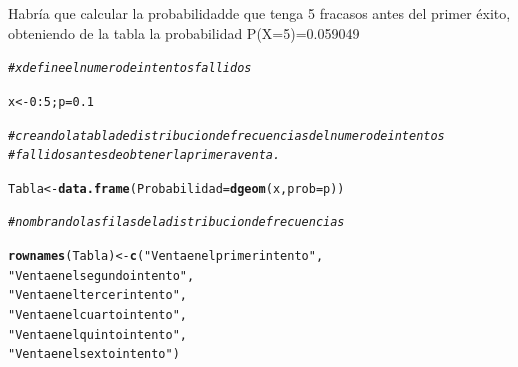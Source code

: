 \documentclass[12pt,letterpaper]{article}\usepackage[]{graphicx}\usepackage[]{color}
\makeatletter
\newcommand{\hlnum}[1]{\textcolor[rgb]{0.686,0.059,0.569}{#1}}%
\newcommand{\hlstr}[1]{\textcolor[rgb]{0.192,0.494,0.8}{#1}}%
\newcommand{\hlcom}[1]{\textcolor[rgb]{0.678,0.584,0.686}{\textit{#1}}}%
\newcommand{\hlopt}[1]{\textcolor[rgb]{0,0,0}{#1}}%
\newcommand{\hlstd}[1]{\textcolor[rgb]{0.345,0.345,0.345}{#1}}%
\newcommand{\hlkwb}[1]{\textcolor[rgb]{0.69,0.353,0.396}{#1}}%
\newcommand{\hlkwc}[1]{\textcolor[rgb]{0.333,0.667,0.333}{#1}}%
\newcommand{\hlkwd}[1]{\textcolor[rgb]{0.737,0.353,0.396}{\textbf{#1}}}%
\newenvironment{kframe}{%
 \def\at@end@of@kframe{}%
 \ifinner\ifhmode%
  \def\at@end@of@kframe{\end{minipage}}%
  \begin{minipage}{\columnwidth}%
 \fi\fi%
 \def\FrameCommand##1{\hskip\@totalleftmargin \hskip-\fboxsep
 \colorbox{shadecolor}{##1}\hskip-\fboxsep
     \hskip-\linewidth \hskip-\@totalleftmargin \hskip\columnwidth}%
 \MakeFramed {\advance\hsize-\width
   \@totalleftmargin\z@ \linewidth\hsize
   \@setminipage}}%
 {\par\unskip\endMakeFramed%
 \at@end@of@kframe}
\newenvironment{knitrout}{}{} %
\makeatother
\begin{document}
\begin{itemize}
Habr\'ia que calcular la probabilidadde que tenga 5 fracasos antes del primer \'exito, obteniendo de la tabla la probabilidad P(X=5)=0.059049
\begin{knitrout}
\color{fgcolor}\begin{kframe}
\begin{alltt}
\hlcom{# x define el numero de intentos fallidos}

\hlstd{x} \hlkwb{<-} \hlnum{0}\hlopt{:}\hlnum{5}\hlstd{; p}\hlkwb{=}\hlnum{0.1}

\hlcom{# creando la tabla de distribucion de frecuencias del numero de intentos }
\hlcom{# fallidos antes de obtener la primera venta. }

\hlstd{Tabla} \hlkwb{<-} \hlkwd{data.frame}\hlstd{(}\hlkwc{Probabilidad}\hlstd{=}\hlkwd{dgeom}\hlstd{(x,} \hlkwc{prob}\hlstd{=p))}

\hlcom{# nombrando las filas de la distribucion de frecuencias}

\hlkwd{rownames}\hlstd{(Tabla)} \hlkwb{<-} \hlkwd{c}\hlstd{(}\hlstr{"Venta en el primer intento"}\hlstd{,}
                     \hlstr{"Venta en el segundo intento"}\hlstd{,}
                     \hlstr{"Venta en el tercer intento"}\hlstd{,}
                     \hlstr{"Venta en el cuarto intento"}\hlstd{,}
                     \hlstr{"Venta en el quinto intento"}\hlstd{,}
                     \hlstr{"Venta en el sexto intento"}\hlstd{)}


\end{alltt}
\end{kframe}
\end{knitrout}
\end{itemize}
\end{document}
